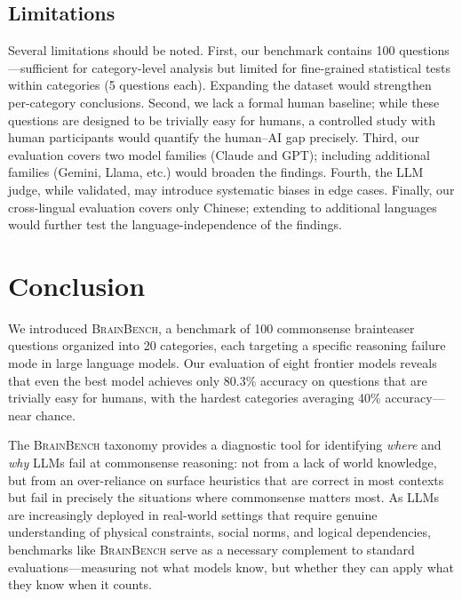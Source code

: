 \documentclass[11pt]{article}
\newcommand{\bench}{\textsc{BrainBench}}
\begin{document}
\subsection{Limitations}

Several limitations should be noted. First, our benchmark contains 100 questions---sufficient for category-level analysis but limited for fine-grained statistical tests within categories (5 questions each). Expanding the dataset would strengthen per-category conclusions. Second, we lack a formal human baseline; while these questions are designed to be trivially easy for humans, a controlled study with human participants would quantify the human--AI gap precisely. Third, our evaluation covers two model families (Claude and GPT); including additional families (Gemini, Llama, etc.) would broaden the findings. Fourth, the LLM judge, while validated, may introduce systematic biases in edge cases. Finally, our cross-lingual evaluation covers only Chinese; extending to additional languages would further test the language-independence of the findings.

\section{Conclusion}
\label{sec:conclusion}

We introduced \bench{}, a benchmark of 100 commonsense brainteaser questions organized into 20 categories, each targeting a specific reasoning failure mode in large language models. Our evaluation of eight frontier models reveals that even the best model achieves only 80.3\% accuracy on questions that are trivially easy for humans, with the hardest categories averaging 40\% accuracy---near chance.

The \bench{} taxonomy provides a diagnostic tool for identifying \emph{where} and \emph{why} LLMs fail at commonsense reasoning: not from a lack of world knowledge, but from an over-reliance on surface heuristics that are correct in most contexts but fail in precisely the situations where commonsense matters most. As LLMs are increasingly deployed in real-world settings that require genuine understanding of physical constraints, social norms, and logical dependencies, benchmarks like \bench{} serve as a necessary complement to standard evaluations---measuring not what models know, but whether they can apply what they know when it counts.
\end{document}
